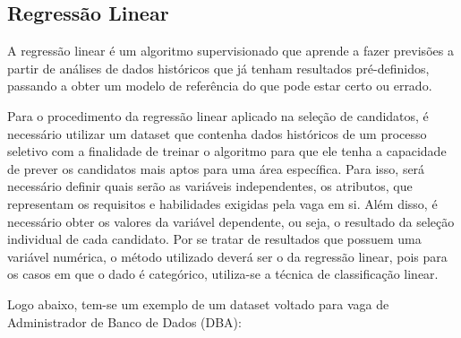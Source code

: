 \documentclass[conference]{IEEEtran}
\begin{document}
\vspace{7mm}

\subsection{Regressão Linear}
A regressão linear é um algoritmo supervisionado que aprende a fazer previsões a partir de análises de dados históricos que já tenham resultados pré-definidos, passando a obter um modelo de referência do que pode estar certo ou errado. 

Para o procedimento da regressão linear aplicado na seleção de candidatos, é necessário utilizar um dataset que contenha dados históricos de um processo seletivo com a finalidade de treinar o algoritmo para que ele tenha a capacidade de prever os candidatos mais aptos para uma área específica. Para isso, será necessário definir quais serão as variáveis independentes, os atributos, que representam os requisitos e habilidades exigidas pela vaga em si.
Além disso, é necessário obter os valores da variável dependente, ou seja, o resultado da seleção individual de cada candidato. Por se tratar de resultados que possuem uma variável numérica, o método utilizado deverá ser o da regressão linear, pois para os casos em que o dado é categórico, utiliza-se a técnica de classificação linear.

Logo abaixo, tem-se um exemplo de um dataset voltado para vaga de Administrador de Banco de Dados (DBA):
\end{document}
